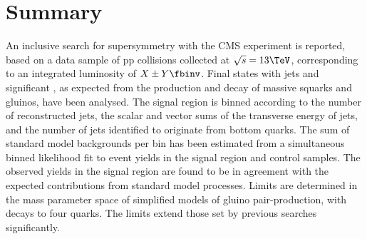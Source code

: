\section{Summary}
\label{sec:summary}

An inclusive search for supersymmetry with the CMS experiment is
reported, based on a data sample of pp collisions collected at
$\sqrt{s} = 13\TeV$, corresponding to an integrated luminosity of $X
\pm Y \fbinv$. Final states with jets and
significant \met, as expected from the production and decay of massive
squarks and gluinos, have been analysed.  The signal region is binned
according to the number of reconstructed jets, the scalar and vector sums of the
transverse energy of jets, and the number of jets identified to
originate from bottom quarks. The sum of standard model backgrounds
per bin has been estimated from a simultaneous binned likelihood fit
to event yields in the signal region and control samples. 
The observed yields in the signal region are found to be in agreement
with the expected contributions from standard model processes. Limits
are determined in the mass parameter space of simplified models of gluino pair-production, with decays to four quarks. 
The limits extend those set by previous searches significantly.

